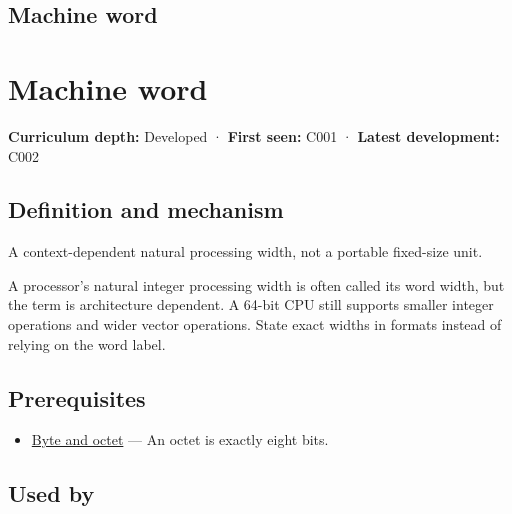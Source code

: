 \hypertarget{appendix-d67a19507dc5}{}
\section*{Machine word}
\chapter{Machine word}\label{appendix-d67a19507dc5-machine-word}

\textbf{Curriculum depth:} Developed · \textbf{First seen:} C001 · \textbf{Latest development:} C002

\section{Definition and mechanism}\label{appendix-d67a19507dc5-definition-and-mechanism}

A context-dependent natural processing width, not a portable fixed-size unit.

A processor's natural integer processing width is often called its word width, but the term is architecture dependent. A 64-bit CPU still supports smaller integer operations and wider vector operations. State exact widths in formats instead of relying on the word label.

\section{Prerequisites}\label{appendix-d67a19507dc5-prerequisites}

\begin{itemize}
\tightlist
\item
  \hyperref[appendix-5bee2df85484]{Byte and octet} --- An octet is exactly eight bits.
\end{itemize}

\section{Used by}\label{appendix-d67a19507dc5-used-by}

